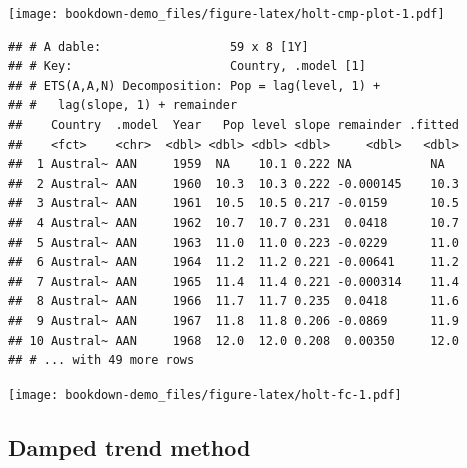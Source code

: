 \documentclass[]{book}
\newenvironment{Shaded}{\begin{snugshade}}{\end{snugshade}}
\newcommand{\DataTypeTok}[1]{\textcolor[rgb]{0.13,0.29,0.53}{#1}}
\newcommand{\DecValTok}[1]{\textcolor[rgb]{0.00,0.00,0.81}{#1}}
\newcommand{\KeywordTok}[1]{\textcolor[rgb]{0.13,0.29,0.53}{\textbf{#1}}}
\newcommand{\NormalTok}[1]{#1}
\newcommand{\OperatorTok}[1]{\textcolor[rgb]{0.81,0.36,0.00}{\textbf{#1}}}
\newcommand{\StringTok}[1]{\textcolor[rgb]{0.31,0.60,0.02}{#1}}
\begin{document}
\texttt{[image: bookdown-demo\_files/figure-latex/holt-cmp-plot-1.pdf]}

\begin{Shaded}
\end{Shaded}

\begin{verbatim}
## # A dable:                  59 x 8 [1Y]
## # Key:                      Country, .model [1]
## # ETS(A,A,N) Decomposition: Pop = lag(level, 1) +
## #   lag(slope, 1) + remainder
##    Country  .model  Year   Pop level slope remainder .fitted
##    <fct>    <chr>  <dbl> <dbl> <dbl> <dbl>     <dbl>   <dbl>
##  1 Austral~ AAN     1959  NA    10.1 0.222 NA           NA  
##  2 Austral~ AAN     1960  10.3  10.3 0.222 -0.000145    10.3
##  3 Austral~ AAN     1961  10.5  10.5 0.217 -0.0159      10.5
##  4 Austral~ AAN     1962  10.7  10.7 0.231  0.0418      10.7
##  5 Austral~ AAN     1963  11.0  11.0 0.223 -0.0229      11.0
##  6 Austral~ AAN     1964  11.2  11.2 0.221 -0.00641     11.2
##  7 Austral~ AAN     1965  11.4  11.4 0.221 -0.000314    11.4
##  8 Austral~ AAN     1966  11.7  11.7 0.235  0.0418      11.6
##  9 Austral~ AAN     1967  11.8  11.8 0.206 -0.0869      11.9
## 10 Austral~ AAN     1968  12.0  12.0 0.208  0.00350     12.0
## # ... with 49 more rows
\end{verbatim}

\begin{Shaded}
\end{Shaded}

\texttt{[image: bookdown-demo\_files/figure-latex/holt-fc-1.pdf]}

\hypertarget{damped-trend-method}{%
\subsection{Damped trend method}\label{damped-trend-method}}
\end{document}
